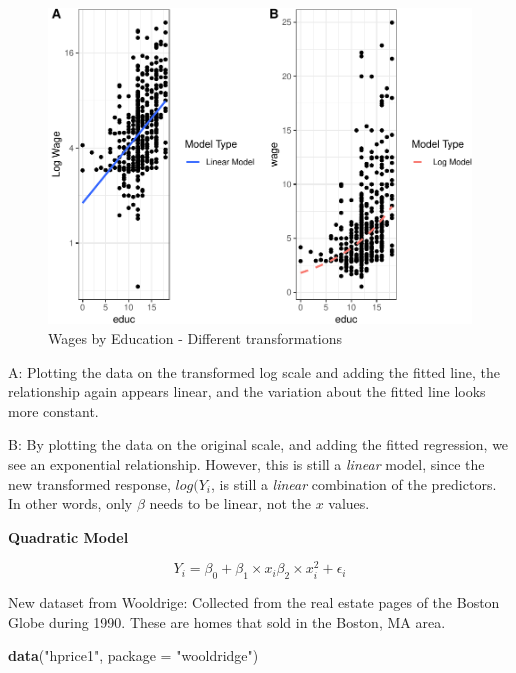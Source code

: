\documentclass[]{book}
\newenvironment{Shaded}{\begin{snugshade}}{\end{snugshade}}
\newcommand{\DataTypeTok}[1]{\textcolor[rgb]{0.13,0.29,0.53}{#1}}
\newcommand{\KeywordTok}[1]{\textcolor[rgb]{0.13,0.29,0.53}{\textbf{#1}}}
\newcommand{\NormalTok}[1]{#1}
\newcommand{\StringTok}[1]{\textcolor[rgb]{0.31,0.60,0.02}{#1}}
\begin{document}
\begin{figure}

{\centering \includegraphics[width=0.8\linewidth]{MEM5220_R_files/figure-latex/fig15-1} 

}

\caption{Wages by Education - Different transformations}\label{fig:fig15}
\end{figure}

A: Plotting the data on the transformed log scale and adding the fitted line, the relationship again appears linear, and the variation about the fitted line looks more constant.

B: By plotting the data on the original scale, and adding the fitted regression, we see an exponential relationship. However, this is still a \emph{linear} model, since the new transformed response, \(log(Y_{i}\), is still a \emph{linear} combination of the predictors. In other words, only \(\beta\) needs to be linear, not the \(x\) values.

\textbf{Quadratic Model}

\begin{equation}
Y_{i} = \beta_{0} + \beta_{1} \times x_{i}  \beta_{2} \times x^2_{i} + \epsilon_{i}
\end{equation}

New dataset from Wooldrige: Collected from the real estate pages of the Boston Globe during 1990. These are homes that sold in the Boston, MA area.

\begin{Shaded}
\begin{Highlighting}[]
\KeywordTok{data}\NormalTok{(}\StringTok{"hprice1"}\NormalTok{, }\DataTypeTok{package =} \StringTok{"wooldridge"}\NormalTok{)}
\end{Highlighting}
\end{Shaded}
\end{document}
